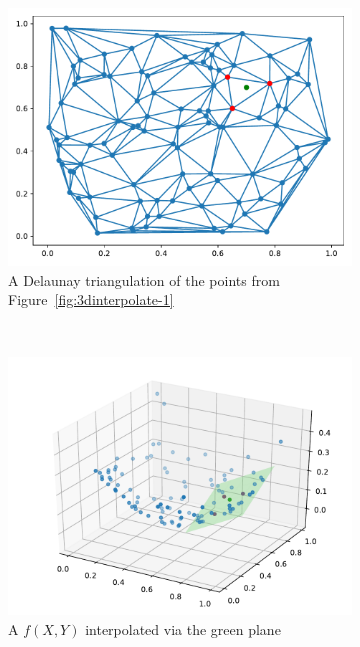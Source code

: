 \begin{figure}[] %
	\centering
	\begin{subfigure}[t]{0.48\textwidth}
		\centering
		\includegraphics[width=\linewidth]{images/vis2d2.pdf}
		\caption{A Delaunay triangulation of the points from Figure~\ref{fig:3dinterpolate-1}}
	\label{fig:3dinterpolate-2}
	\end{subfigure}%
	~ 
	\begin{subfigure}[t]{0.48\textwidth}
		\centering
		\includegraphics[width=\linewidth]{images/vis2d3.pdf}
		\caption{A $f(X,Y)$ interpolated via the green plane}
		\label{fig:3dinterpolate-3}
	\end{subfigure}
	\caption{}

\end{figure}



